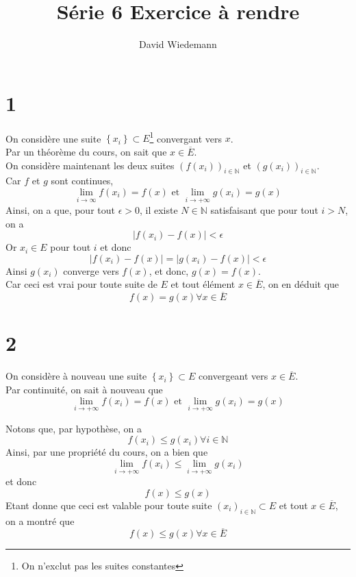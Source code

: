 \documentclass[11pt, a4paper]{article}
\begin{document}
\title{Série 6 Exercice à rendre}
\author{David Wiedemann}
\maketitle
\section*{1}
On considère une suite $ \left\{ x_i \right\} \subset E$\footnote{On n'exclut pas les suites constantes} convergant vers $x$.\\
Par un théorème du cours, on sait que $x \in \overline{E}$.\\
On considère maintenant les deux suites $( f( x_i) )_{i \in \mathbb{N}}  $ et $( g( x_{i} ) )_{i \in \mathbb{N}}$.\\
Car $f$ et $g$ sont continues, 
\[ 
	\lim_{i \to \infty } f( x_i) = f( x) \text{ et } \lim_{i \to  + \infty} g( x_i) = g( x) 
\]
Ainsi, on a que, pour tout $\epsilon>0$, il existe $N \in \mathbb{N}$ satisfaisant que pour tout $i>N$, on a
\[ 
	|f( x_i) - f( x)| < \epsilon
\]
Or $x_i \in E$ pour tout $i$ et donc
\[ 
	|f( x_i) - f( x)| =|g( x_i) - f( x)| <\epsilon
\]
Ainsi $g( x_i) $ converge vers $f( x) $, et donc, $g( x) = f( x) $.\\
Car ceci est vrai pour toute suite de $E$ et tout élément $x \in \overline{E}$, on en déduit que 
\[ 
	f( x) =g( x)  \forall x \in \overline{E}
\]

\section*{2}
On considère à nouveau une suite $ \left\{ x_i \right\} \subset E$ convergeant vers $x \in \overline{E}$.\\
Par continuité, on sait à nouveau que 
\[ 
	\lim_{i \to +\infty } f( x_i) = f( x) \text{ et } \lim_{i \to  + \infty} g( x_i) = g( x) 
\]

Notons que, par hypothèse, on a
\[ 
	f( x_i) \leq g( x_i) \forall i \in \mathbb{N}
\]
Ainsi, par une propriété du cours, on a bien que
\[ 
	\lim_{i \to  + \infty} f( x_i) \leq \lim_{i \to  + \infty} g( x_i) 
\]
et donc
\[ 
	f( x) \leq g( x) 
\]
Etant donne que ceci est valable pour toute suite  $ ( x_i)_{i \in \mathbb{N}} \subset E$ et tout $x \in \overline{E}$, on a montré que
\[ 
	f( x) \leq g( x) \forall x \in \overline{E}
\]
\end{document}
